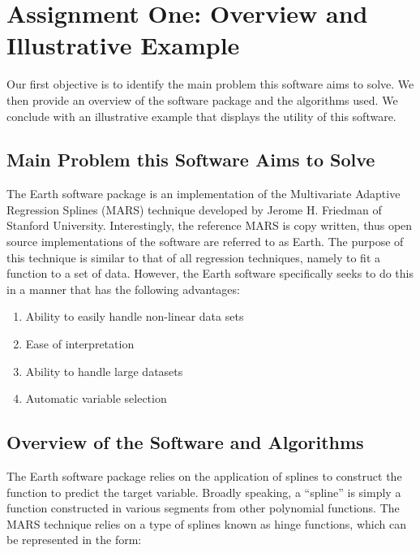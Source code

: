 

\graphicspath{{C:/Documents and Settings/amcelhinney/My Documents/GitHub/MCS507ProjectTwo/tex/include/}}

\section{Assignment One: Overview and Illustrative Example} %
\label{sec: Main Problem}
Our first objective is to identify the main problem this software aims to solve. We then provide an overview of the software package and the algorithms used. We conclude with an illustrative example that displays the utility of this software.

\subsection{Main Problem this Software Aims to Solve} %
\label{sub:methoda}
The Earth software package is an implementation of the Multivariate Adaptive Regression Splines (MARS) technique developed by Jerome H. Friedman of Stanford University. Interestingly, the reference MARS is copy written, thus open source implementations of the software are referred to as Earth. The purpose of this technique is similar to that of all regression techniques, namely to fit a function to a set of data. However, the Earth software specifically seeks to do this in a manner that has the following advantages:
\begin{enumerate}
\item Ability to easily handle non-linear data sets
\item Ease of interpretation 
\item Ability to handle large datasets
\item Automatic variable selection
\end{enumerate}



\subsection{Overview of the Software and Algorithms} %
The Earth software package relies on the application of splines to construct the function to predict the target variable. Broadly speaking, a “spline” is simply a function constructed in various segments from other polynomial functions. The MARS technique relies on a type of splines known as hinge functions, which can be represented in the form:  

